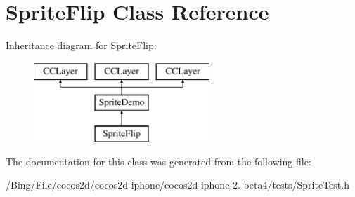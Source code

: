 \hypertarget{interface_sprite_flip}{\section{Sprite\-Flip Class Reference}
\label{interface_sprite_flip}
}
Inheritance diagram for Sprite\-Flip\-:\begin{figure}[H]
\begin{center}
\leavevmode
\includegraphics[height=3.000000cm]{interface_sprite_flip}
\end{center}
\end{figure}


The documentation for this class was generated from the following file\-:\begin{DoxyCompactItemize}
\item 
/\-Bing/\-File/cocos2d/cocos2d-\/iphone/cocos2d-\/iphone-\/2.-\/beta4/tests/Sprite\-Test.\-h\end{DoxyCompactItemize}
